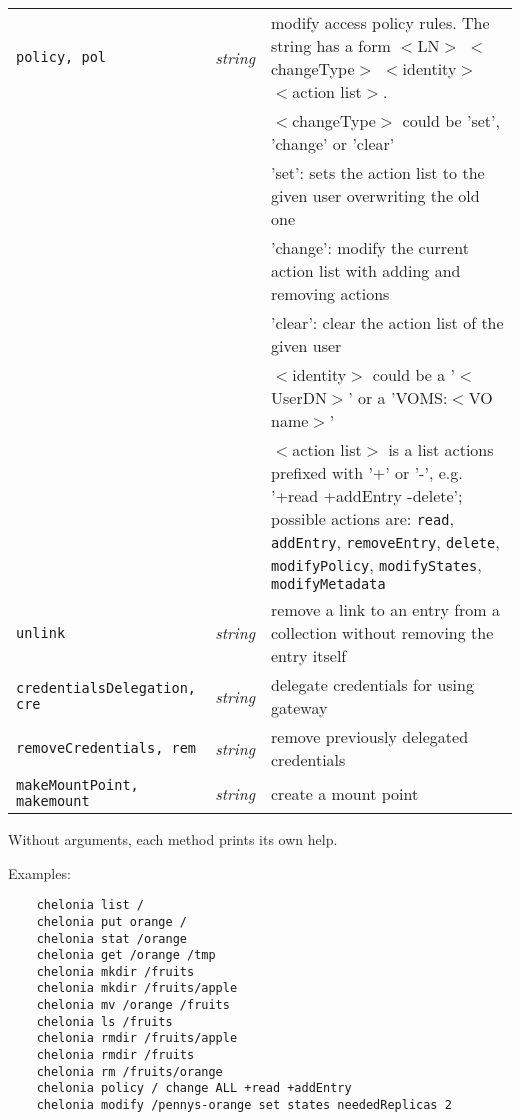 \begin{longtable}{llp{8cm}}
   \texttt{policy, pol} &\textit{string}& modify access policy rules. The string has a form $<$LN$>$ $<$changeType$>$ $<$identity$>$ $<$action list$>$.\\
   & &$<$changeType$>$ could be 'set', 'change' or 'clear'\\
   & & 'set': sets the action list to the given user overwriting the old one\\
   & & 'change': modify the current action list with adding and removing actions\\
   & & 'clear': clear the action list of the given user\\
   & &$<$identity$>$ could be a '$<$UserDN$>$' or a 'VOMS:$<$VO name$>$'\\
   & &$<$action list$>$ is a list actions prefixed with '+' or '-', e.g. '+read +addEntry -delete'; possible actions are: \texttt{read}, \texttt{addEntry}, \texttt{removeEntry}, \texttt{delete}, \texttt{modifyPolicy}, \texttt{modifyStates}, \texttt{modifyMetadata}\\
   \texttt{unlink} &\textit{string}& remove a link to an entry from a collection without removing the entry itself\\
   \texttt{credentialsDelegation, cre} &\textit{string}& delegate credentials for using gateway\\
   \texttt{removeCredentials, rem} &\textit{string}& remove previously delegated credentials\\
   \texttt{makeMountPoint, makemount} &\textit{string}& create a mount point\\
\end{longtable}

Without arguments, each method prints its own help.

Examples:
\begin{verbatim}
    chelonia list /
    chelonia put orange /
    chelonia stat /orange
    chelonia get /orange /tmp
    chelonia mkdir /fruits
    chelonia mkdir /fruits/apple
    chelonia mv /orange /fruits
    chelonia ls /fruits
    chelonia rmdir /fruits/apple
    chelonia rmdir /fruits
    chelonia rm /fruits/orange
    chelonia policy / change ALL +read +addEntry
    chelonia modify /pennys-orange set states neededReplicas 2
\end{verbatim}
